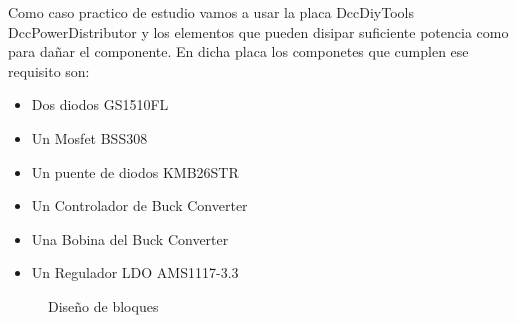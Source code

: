 
Como caso practico de estudio vamos a usar la placa DccDiyTools DccPowerDistributor y los elementos que
pueden disipar suficiente potencia como para dañar el componente. En dicha placa los 
componetes que cumplen ese requisito son:
\begin{itemize}
    \item Dos diodos GS1510FL
    \item Un Mosfet BSS308
    \item Un puente de diodos KMB26STR
    \item Un Controlador de Buck Converter
    \item Una Bobina del Buck Converter
    \item Un Regulador LDO AMS1117-3.3
\end{itemize}

\begin{figure}[H]
    \centering
    
    \caption{Diseño de bloques}
    \label{fig:Bloques}
\end{figure}